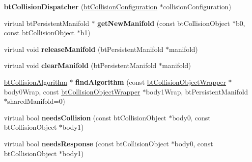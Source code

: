 \begin{DoxyCompactItemize}
\item 
\mbox{\label{classbtCollisionDispatcher_a4d71913fba02e45b4cfcba7178930d25}} 
{\bfseries bt\+Collision\+Dispatcher} (\hyperlink{classbtCollisionConfiguration}{bt\+Collision\+Configuration} $\ast$collision\+Configuration)
\item 
\mbox{\label{classbtCollisionDispatcher_ae732f8831ed78e651998d0333f7b1e87}} 
virtual bt\+Persistent\+Manifold $\ast$ {\bfseries get\+New\+Manifold} (const bt\+Collision\+Object $\ast$b0, const bt\+Collision\+Object $\ast$b1)
\item 
\mbox{\label{classbtCollisionDispatcher_a15a62e7b404578fd654385478708a66c}} 
virtual void {\bfseries release\+Manifold} (bt\+Persistent\+Manifold $\ast$manifold)
\item 
\mbox{\label{classbtCollisionDispatcher_a5e28bb54559e714383e0f5fde8db5e8b}} 
virtual void {\bfseries clear\+Manifold} (bt\+Persistent\+Manifold $\ast$manifold)
\item 
\mbox{\label{classbtCollisionDispatcher_a8352b6c5ce3c1b667165371f352708c4}} 
\hyperlink{classbtCollisionAlgorithm}{bt\+Collision\+Algorithm} $\ast$ {\bfseries find\+Algorithm} (const \hyperlink{structbtCollisionObjectWrapper}{bt\+Collision\+Object\+Wrapper} $\ast$body0\+Wrap, const \hyperlink{structbtCollisionObjectWrapper}{bt\+Collision\+Object\+Wrapper} $\ast$body1\+Wrap, bt\+Persistent\+Manifold $\ast$shared\+Manifold=0)
\item 
\mbox{\label{classbtCollisionDispatcher_a981a8487d0ae9baa451ecc373afb5175}} 
virtual bool {\bfseries needs\+Collision} (const bt\+Collision\+Object $\ast$body0, const bt\+Collision\+Object $\ast$body1)
\item 
\mbox{\label{classbtCollisionDispatcher_a8beef83d9a4e227917d0f9f9bd8c2f01}} 
virtual bool {\bfseries needs\+Response} (const bt\+Collision\+Object $\ast$body0, const bt\+Collision\+Object $\ast$body1)
\item 
\mbox{\label{classbtCollisionDispatcher_ac98bf7bd26f0161235ee34501010e6cf}} 

\end{DoxyCompactItemize}
